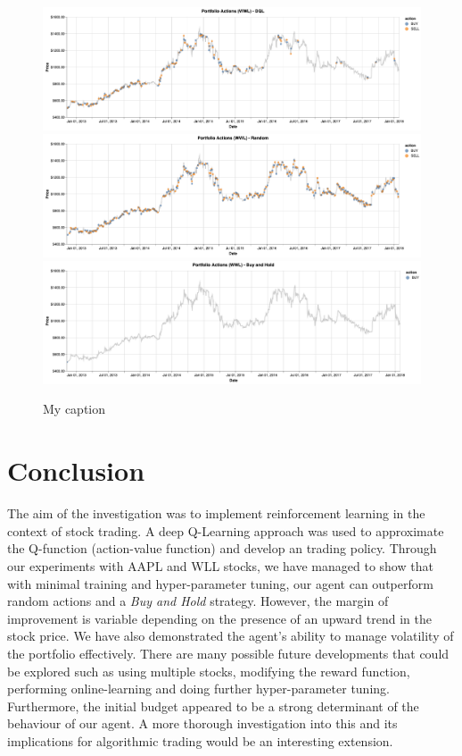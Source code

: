 \documentclass[12pt, authoryear]{elsarticle}
\begin{document}
\begin{figure}[h!]
  \begin{center} 
  	\caption{My caption}
  	\label{my-label}
	\includegraphics[scale=0.4]{figures/wwl_action_dql.png} \\
	\includegraphics[scale=0.4]{figures/wwl_action_rand.png} \\
	\includegraphics[scale=0.4]{figures/wwl_action_bh.png} \\
\end{center} 
\end{figure}

\section{Conclusion}

The aim of the investigation was to implement reinforcement learning in the context of stock trading. A deep Q-Learning approach was used to approximate the Q-function (action-value function) and develop an trading policy. Through our experiments with AAPL and WLL stocks, we have managed to show that with minimal training and hyper-parameter tuning, our agent can outperform random actions and a \textit{Buy and Hold} strategy. However, the margin of improvement is variable depending on the presence of an upward trend in the stock price.  We have also demonstrated the agent's ability to manage volatility of the portfolio effectively. There are many possible future developments that could be explored such as using multiple stocks, modifying the reward function, performing online-learning and doing further hyper-parameter tuning. Furthermore, the initial budget appeared to be a strong determinant of the behaviour of our agent. A more thorough investigation into this and its implications for algorithmic trading would be an interesting extension.
\end{document}
